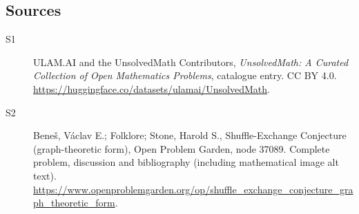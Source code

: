 \documentclass[11pt]{book}
\begin{document}
\subsection{Sources}
\begin{description}
\item[\hypertarget{source:statement:1}{S1}] ULAM.AI and the UnsolvedMath Contributors, \emph{UnsolvedMath: A Curated Collection of Open Mathematics Problems}, catalogue entry. CC BY 4.0. \url{https://huggingface.co/datasets/ulamai/UnsolvedMath}.
\item[\hypertarget{source:statement:2}{S2}] Beneš, Václav E.; Folklore; Stone, Harold S., Shuffle-Exchange Conjecture (graph-theoretic form), Open Problem Garden, node 37089. Complete problem, discussion and bibliography (including mathematical image alt text). \url{https://www.openproblemgarden.org/op/shuffle_exchange_conjecture_graph_theoretic_form}.
\end{description}
\label{end:statement}
\end{document}
